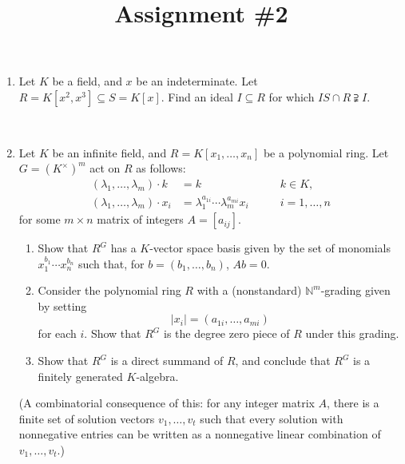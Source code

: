 \documentclass{amsart}[12pt]
\title{Assignment \#2}
\newcommand{\N}{\mathbb{N}}
\numberwithin{equation}{section}
\theoremstyle{plain} %
\theoremstyle{definition}
\theoremstyle{remark}
\begin{document}
\onehalfspacing

\maketitle




\begin{enumerate}


\item Let $K$ be a field, and $x$ be an indeterminate. Let $R=K[x^2,x^3] \subseteq S= K[x]$. Find an ideal $I\subseteq R$ for which $IS \cap R \supsetneqq I$.

\


\item  Let $K$ be an infinite field, and $R = K[x_1,\dots, x_n]$ be a polynomial ring. Let $G= (K^\times)^m$ act on $R$ as follows: 
\[ \begin{aligned} (\lambda_1,\dots,\lambda_m) \cdot k &= k \qquad & k\in K,\\
 (\lambda_1,\dots,\lambda_m) \cdot x_i &= \lambda_1^{a_{1i}} \cdots  \lambda_m^{a_{mi}} x_i \qquad & {i=1,\dots,n}
 \end{aligned}\]
 for some $m\times n$ matrix of integers $A=[a_{ij}]$.

\begin{enumerate} 
\item Show that $R^G$ has a $K$-vector space basis given by the set of monomials $x_1^{b_1} \cdots x_n^{b_n}$ such that, for $b=(b_1,\dots,b_n)$, $Ab=0$.
\item Consider the polynomial ring $R$ with a (nonstandard) $\N^m$-grading given by setting \[ |x_i| = (a_{1i},\dots,a_{mi})\] for each $i$. Show that $R^G$ is the degree zero piece of $R$ under this grading.
\item Show that $R^G$ is a direct summand of $R$, and conclude that $R^G$ is a finitely generated $K$-algebra.
\end{enumerate}
(A combinatorial consequence of this: for any integer matrix $A$, there is a finite set of solution vectors $v_1,\dots,v_t$ such that every solution with nonnegative entries can be written as a nonnegative linear combination of $v_1,\dots,v_t$.)

\


\end{enumerate}
\end{document}

